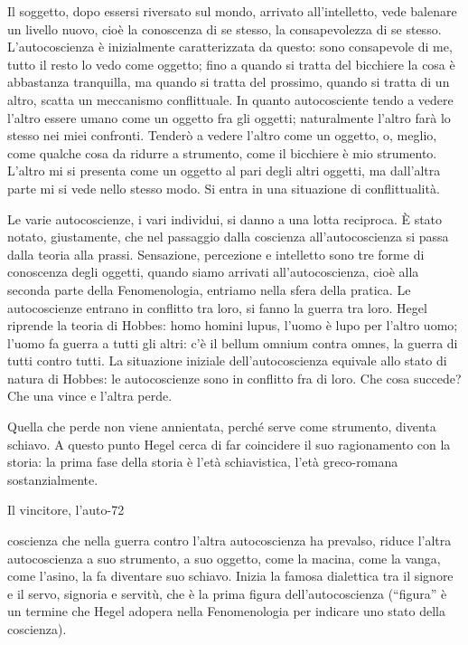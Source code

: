 \documentclass[a4paper,12pt,oneside,openany]{book}%
\begin{document}
Il soggetto, dopo essersi riversato sul mondo, arrivato all’intelletto, vede balenare un livello nuovo, cioè la conoscenza di se stesso, la consapevolezza di se stesso. L’autocoscienza è inizialmente caratterizzata da questo: sono consapevole di me, tutto il resto lo vedo come oggetto; fino a quando si tratta del bicchiere la cosa è abbastanza tranquilla, ma quando si tratta del prossimo, quando si tratta di un altro, scatta un meccanismo conflittuale. In quanto autocosciente tendo a vedere l’altro essere umano come un oggetto fra gli oggetti; naturalmente l’altro farà lo stesso nei miei confronti. Tenderò a vedere l’altro come un oggetto, o, meglio, come qualche cosa da ridurre a strumento, come il bicchiere è mio strumento. L’altro mi si presenta come un oggetto al pari degli altri oggetti, ma dall’altra parte mi si vede nello stesso modo. Si entra in una situazione di conflittualità.

Le varie autocoscienze, i vari individui, si danno a una lotta reciproca. È stato notato, giustamente, che nel passaggio dalla coscienza all’autocoscienza si passa dalla teoria alla prassi. Sensazione, percezione e intelletto sono tre forme di conoscenza degli oggetti, quando siamo arrivati all’autocoscienza, cioè alla seconda parte della Fenomenologia, entriamo nella sfera della pratica. Le autocoscienze entrano in conflitto tra loro, si fanno la guerra tra loro. Hegel riprende la teoria di Hobbes: homo homini lupus, l’uomo è lupo per l’altro uomo; l’uomo fa guerra a tutti gli altri: c’è il bellum omnium contra omnes, la guerra di tutti contro tutti. La situazione iniziale dell’autocoscienza equivale allo stato di natura di Hobbes: le autocoscienze sono in conflitto fra di loro. Che cosa succede? Che una vince e l’altra perde.

Quella che perde non viene annientata, perché serve come strumento, diventa schiavo. A questo punto Hegel cerca di far coincidere il suo ragionamento con la storia: la prima fase della storia è l’età schiavistica, l’età greco-romana sostanzialmente.

Il vincitore, l’auto-72

coscienza che nella guerra contro l’altra autocoscienza ha prevalso, riduce l’altra autocoscienza a suo strumento, a suo oggetto, come la macina, come la vanga, come l’asino, la fa diventare suo schiavo. Inizia la famosa dialettica tra il signore e il servo, signoria e servitù, che è la prima figura dell’autocoscienza (“figura” è un termine che Hegel adopera nella Fenomenologia per indicare uno stato della coscienza).
\end{document}
